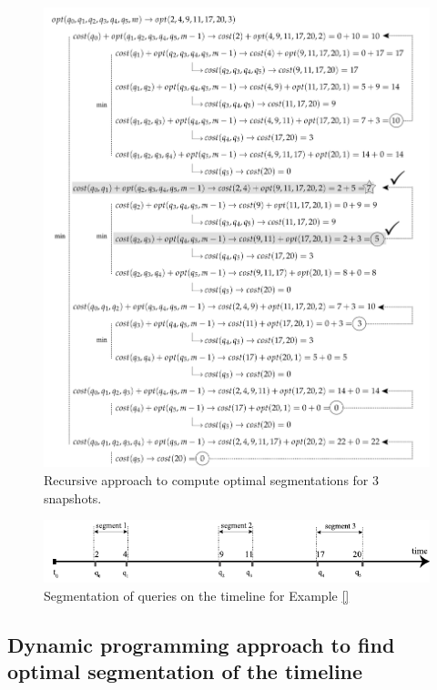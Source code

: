 			\begin{figure}
				\centering
				\includegraphics[width=\textwidth]{figs/recursion_example.pdf}
				\caption{Recursive approach to compute optimal segmentations for 3 snapshots.}
				\label{fig:example_recursive_steps}
			\end{figure}


			\begin{figure}
				\centering
				\includegraphics[width=\textwidth]{figs/example_recursive_s.pdf}
				\caption{Segmentation of queries on the timeline for Example \ref{}}
				\label{fig:example_recursive_segmentation}
			\end{figure}


		\subsection{Dynamic programming approach to find optimal segmentation of the timeline} \label{sec:dynamic_programming_optimal_segment}

